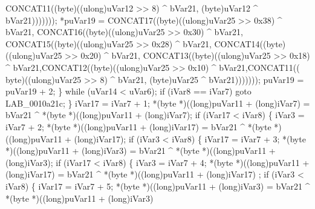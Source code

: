 \documentclass[
]{article}
\newenvironment{Shaded}{}{}
\newcommand{\NormalTok}[1]{#1}
\begin{document}
\begin{Shaded}
\begin{Highlighting}[]
\NormalTok{                                                  CONCAT11((byte)((ulong)uVar12 \textgreater{}\textgreater{} 8) \^{} bVar21,}
\NormalTok{                                                           (byte)uVar12 \^{} bVar21)))))));}
\NormalTok{        *puVar19 = CONCAT17((byte)((ulong)uVar25 \textgreater{}\textgreater{} 0x38) \^{} bVar21,}
\NormalTok{                            CONCAT16((byte)((ulong)uVar25 \textgreater{}\textgreater{} 0x30) \^{} bVar21,}
\NormalTok{                                     CONCAT15((byte)((ulong)uVar25 \textgreater{}\textgreater{} 0x28) \^{} bVar21,}
\NormalTok{                                              CONCAT14((byte)((ulong)uVar25 \textgreater{}\textgreater{} 0x20) \^{} bVar21,}
\NormalTok{                                                       CONCAT13((byte)((ulong)uVar25 \textgreater{}\textgreater{} 0x18) \^{}}
\NormalTok{                                                                bVar21,CONCAT12((byte)((ulong)uVar25}
\NormalTok{                                                                                      \textgreater{}\textgreater{} 0x10) \^{}}
\NormalTok{                                                                                bVar21,CONCAT11((}
\NormalTok{                                                  byte)((ulong)uVar25 \textgreater{}\textgreater{} 8) \^{} bVar21,}
\NormalTok{                                                  (byte)uVar25 \^{} bVar21)))))));}
\NormalTok{        puVar19 = puVar19 + 2;}
\NormalTok{      \} while (uVar14 \textless{} uVar6);}
\NormalTok{      if (iVar8 == iVar7) goto LAB\_0010a21c;}
\NormalTok{    \}}
\NormalTok{    iVar17 = iVar7 + 1;}
\NormalTok{    *(byte *)((long)puVar11 + (long)iVar7) = bVar21 \^{} *(byte *)((long)puVar11 + (long)iVar7);}
\NormalTok{    if (iVar17 \textless{} iVar8) \{}
\NormalTok{      iVar3 = iVar7 + 2;}
\NormalTok{      *(byte *)((long)puVar11 + (long)iVar17) = bVar21 \^{} *(byte *)((long)puVar11 + (long)iVar17);}
\NormalTok{      if (iVar3 \textless{} iVar8) \{}
\NormalTok{        iVar17 = iVar7 + 3;}
\NormalTok{        *(byte *)((long)puVar11 + (long)iVar3) = bVar21 \^{} *(byte *)((long)puVar11 + (long)iVar3);}
\NormalTok{        if (iVar17 \textless{} iVar8) \{}
\NormalTok{          iVar3 = iVar7 + 4;}
\NormalTok{          *(byte *)((long)puVar11 + (long)iVar17) = bVar21 \^{} *(byte *)((long)puVar11 + (long)iVar17)}
\NormalTok{          ;}
\NormalTok{          if (iVar3 \textless{} iVar8) \{}
\NormalTok{            iVar17 = iVar7 + 5;}
\NormalTok{            *(byte *)((long)puVar11 + (long)iVar3) = bVar21 \^{} *(byte *)((long)puVar11 + (long)iVar3)}

\end{Highlighting}
\end{Shaded}
\end{document}
